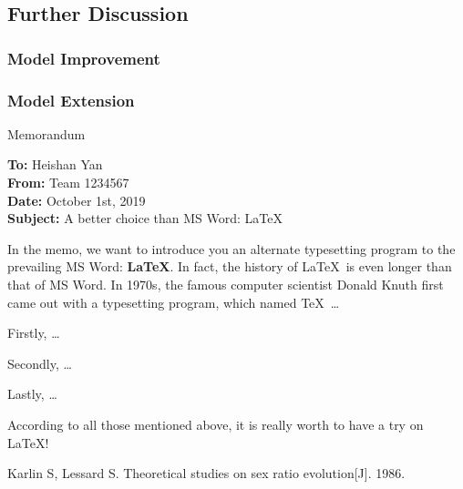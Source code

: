 \documentclass[12pt]{article}  %
\begin{document}
 \subsection{Further Discussion}
 
 \subsubsection{Model Improvement}
 
 \subsubsection{Model Extension}


\begin{letter}{Memorandum}
\begin{flushleft}  %
\textbf{To:} Heishan Yan\\
\textbf{From:} Team 1234567\\
\textbf{Date:} October 1st, 2019\\
\textbf{Subject:} A better choice than MS Word: \LaTeX
\end{flushleft}

In the memo, we want to introduce you an alternate typesetting program to the prevailing MS Word: \textbf{\LaTeX}. In fact, the history of \LaTeX\ is even longer than that of MS Word. In 1970s, the famous computer scientist Donald Knuth first came out with a typesetting program, which named \TeX\ \ldots

Firstly, \ldots

Secondly, \ldots

Lastly, \ldots

According to all those mentioned above, it is really worth to have a try on \LaTeX! 
\end{letter}
\newpage

\begin{thebibliography}{99}
 Karlin S, Lessard S. Theoretical studies on sex ratio evolution[J]. 1986.
\end{thebibliography}
\end{document}
